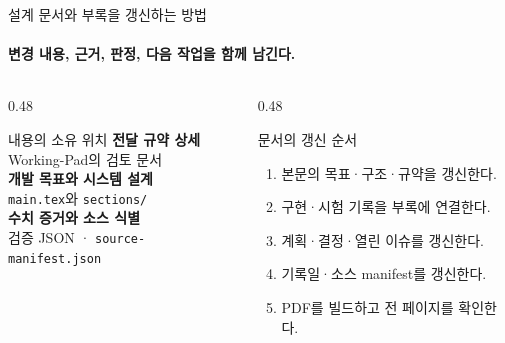 \begin{frame}[label=record-management]{설계 문서와 부록을 갱신하는 방법}
  \framesubtitle{변경 내용, 근거, 판정, 다음 작업을 함께 남긴다.}
  \begin{columns}[T,onlytextwidth]
    \begin{column}{0.48\textwidth}
      \begin{block}{내용의 소유 위치}
        \textbf{전달 규약 상세}\\
        Working-Pad의 검토 문서\\[0.7em]
        \textbf{개발 목표와 시스템 설계}\\
        \texttt{main.tex}와 \texttt{sections/}\\[0.7em]
        \textbf{수치 증거와 소스 식별}\\
        검증 JSON · \texttt{source-manifest.json}
      \end{block}
    \end{column}
    \begin{column}{0.48\textwidth}
      \begin{block}{문서의 갱신 순서}
        \begin{enumerate}
          \item 본문의 목표·구조·규약을 갱신한다.
          \item 구현·시험 기록을 부록에 연결한다.
          \item 계획·결정·열린 이슈를 갱신한다.
          \item 기록일·소스 manifest를 갱신한다.
          \item PDF를 빌드하고 전 페이지를 확인한다.
        \end{enumerate}
      \end{block}
    \end{column}
  \end{columns}
  \medskip
\end{frame}


